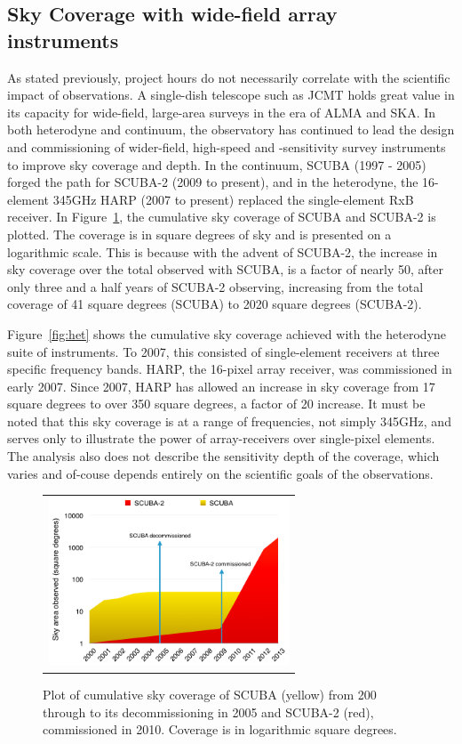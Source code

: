 \documentclass[]{spie}  %
\begin{document}
\subsection{Sky Coverage with wide-field array instruments}

As stated previously, project hours do not necessarily correlate with
the scientific impact of observations. A single-dish telescope such as
JCMT holds great value in its capacity for wide-field, large-area
surveys in the era of ALMA and SKA. In both heterodyne and continuum,
the observatory has continued to lead the design and commissioning of
wider-field, high-speed and -sensitivity survey instruments to improve
sky coverage and depth. In the continuum, SCUBA (1997 - 2005) forged
the path for SCUBA-2 (2009 to present), and in the heterodyne, the
16-element 345GHz HARP (2007 to present) replaced the single-element
RxB receiver. In Figure~\ref{fig:sc2}, the cumulative sky coverage of
SCUBA and SCUBA-2 is plotted. The coverage is in square degrees of sky
and is presented on a logarithmic scale. This is because with the
advent of SCUBA-2, the increase in sky coverage over the total
observed with SCUBA, is a factor of nearly 50, after only three and a
half years of SCUBA-2 observing, increasing from the total coverage of
41 square degrees (SCUBA) to 2020 square degrees (SCUBA-2).

Figure~\ref{fig:het} shows the cumulative sky coverage achieved with
the heterodyne suite of instruments. To 2007, this consisted of
single-element receivers at three specific frequency bands. HARP, the
16-pixel array receiver, was commissioned in early 2007. Since 2007,
HARP has allowed an increase in sky coverage from 17 square degrees to
over 350 square degrees, a factor of 20 increase. It must be noted
that this sky coverage is at a range of frequencies, not simply
345GHz, and serves only to illustrate the power of array-receivers
over single-pixel elements. The analysis also does not describe the
sensitivity depth of the coverage, which varies and of-couse depends
entirely on the scientific goals of the observations.

\begin{figure}[h]
   \begin{center}
   \begin{tabular}{c}
   \includegraphics[height=5cm]{scuba2scuba_areacover.png}
   \end{tabular}
   \end{center}
   \caption{\label{fig:sc2} Plot of cumulative sky coverage of SCUBA (yellow) from 200 through to its decommissioning in 2005 and SCUBA-2 (red), commissioned in 2010. Coverage is in logarithmic square degrees.}
\end{figure}
\end{document}
